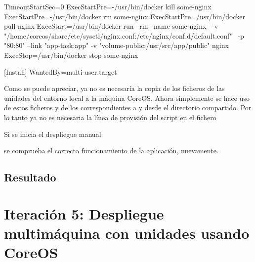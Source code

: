 \begin{codelisting}
\begin{code}
      [Service] 
      TimeoutStartSec=0 
      ExecStartPre=-/usr/bin/docker kill some-nginx 
      ExecStartPre=-/usr/bin/docker rm some-nginx
      ExecStartPre=/usr/bin/docker pull nginx 
      ExecStart=/usr/bin/docker run --rm --name some-nginx \
      -v "/home/coreos/share/etc/sysctl/nginx.conf:/etc/nginx/conf.d/default.conf" \
      -p "80:80" --link "app-task:app" -v "volume-public:/usr/src/app/public" nginx 
      ExecStop=/usr/bin/docker stop some-nginx

      [Install] 
      WantedBy=multi-user.target
  \end{code}
\end{codelisting}

Como se puede apreciar, ya no es necesaría la copia de los ficheros de las unidades del entorno local a la máquina CoreOS. Ahora simplemente se hace uso de estos ficheros y de los correspondientes a  y  desde el directorio compartido. Por lo tanto ya no es necesaria la línea de provisión del script en el fichero 

Si se inicia el despliegue manual:


se comprueba el correcto funcionamiento de la aplicación, nuevamente.

\subsection{Resultado}

\section{Iteración 5: Despliegue multimáquina con unidades usando CoreOS}

